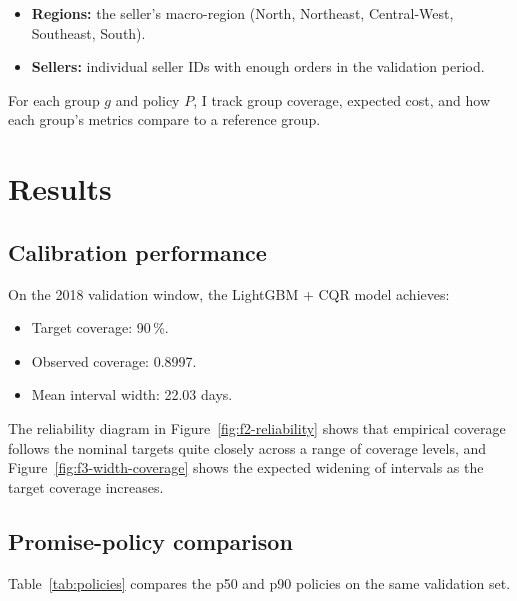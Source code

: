 \documentclass[10pt,twocolumn]{article}
\begin{document}
\begin{itemize}
  \item \textbf{Regions:} the seller's macro-region (North, Northeast, Central-West, Southeast, South).
  \item \textbf{Sellers:} individual seller IDs with enough orders in the validation period.
\end{itemize}

For each group $g$ and policy $P$, I track group coverage, expected cost, and how each group's metrics compare to a reference group.

\section{Results}
\subsection{Calibration performance}
On the 2018 validation window, the LightGBM + CQR model achieves:
\begin{itemize}
  \item Target coverage: 90\,\%.
  \item Observed coverage: 0.8997.
  \item Mean interval width: 22.03 days.
\end{itemize}

The reliability diagram in Figure~\ref{fig:f2-reliability} shows that empirical coverage follows the nominal targets quite closely across a range of coverage levels, and Figure~\ref{fig:f3-width-coverage} shows the expected widening of intervals as the target coverage increases.

\subsection{Promise-policy comparison}
Table~\ref{tab:policies} compares the p50 and p90 policies on the same validation set.

\begin{table}[t]
  \centering
  \caption{Policy metrics for two quantile-based promise policies on the Olist validation set. The cost uses $\lambda_{\text{late}}=5$ and $\lambda_{\text{early}}=1$.}
  \label{tab:policies}
  \setlength{\tabcolsep}{4pt}
  \renewcommand{\arraystretch}{1.1}
\end{table}
\end{document}
